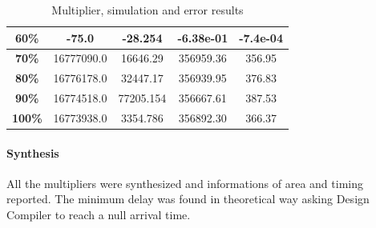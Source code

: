\documentclass[a4paper]{article}
\begin{document}
\begin{table}[hbtp]
\begin{tabular}{|c|c|c|c|c|}
		\textbf{60\%}                                                                   & 		-75.0                                                                           & 		-28.254                                                                          & -6.38e-01                            &		 -7.4e-04                              \\ \hline
		\textbf{70\%}                                                                   & 		16777090.0                                                                      & 		16646.29                                                                         & 356959.36                            &		 356.95                                \\ \hline
		\textbf{80\%}                                                                   & 		16776178.0                                                                      & 		32447.17                                                                         & 356939.95                            &		 376.83                                \\ \hline
		\textbf{90\%}                                                                   & 		16774518.0                                                                      & 		77205.154                                                                        & 356667.61                            &		 387.53                                \\ \hline
		\textbf{100\%}                                                                  & 		16773938.0                                                                      & 		3354.786                                                                         & 356892.30                            &		 366.37                                \\ \hline
		\end{tabular}
		\caption{Multiplier, simulation and error results}
		\label{tab:mult_sim}
	\end{table}

	\paragraph*{Synthesis} All the multipliers were synthesized and informations of area and timing reported. The minimum delay was found in theoretical way asking Design Compiler to reach a null arrival time.
\end{document}
